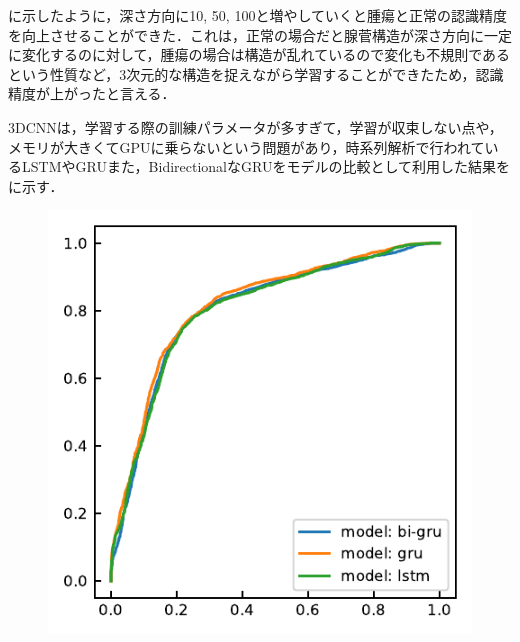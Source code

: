 に示したように，深さ方向に10, 50, 100と増やしていくと腫瘍と正常の認識精度を向上させることができた．これは，正常の場合だと腺菅構造が深さ方向に一定に変化するのに対して，腫瘍の場合は構造が乱れているので変化も不規則であるという性質など，3次元的な構造を捉えながら学習することができたため，認識精度が上がったと言える．

3DCNNは，学習する際の訓練パラメータが多すぎて，学習が収束しない点や，メモリが大きくてGPUに乗らないという問題があり，時系列解析で行われているLSTMやGRUまた，BidirectionalなGRUをモデルの比較として利用した結果をに示す．

\begin{figure}[H]
	\centering
	
	\begin{minipage}[b]{0.33\columnwidth}
		\centering
		\includegraphics[clip, width=\linewidth]{fig/chapter4/3d/roc/depth_10.pdf}
		\label{fig:}
	\end{minipage}
	\begin{minipage}[b]{0.33\columnwidth}
		\centering

\end{minipage}
\end{figure}
